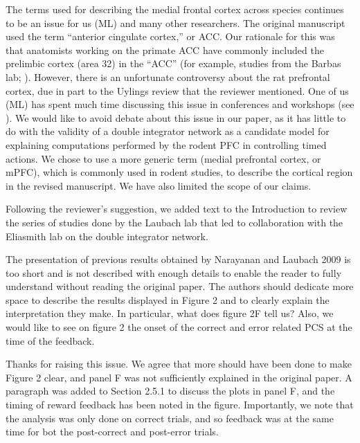 \documentclass[11pt,paper=letter]{scrartcl}
\begin{document}
The terms used for describing the medial frontal cortex
across species continues to be an issue for us (ML)
and many other researchers.
The original manuscript used
the term ``anterior cingulate cortex,'' or ACC.
Our rationale for this was that anatomists
working on the primate ACC
have commonly included the prelimbic cortex
(area 32) in the ``ACC''
(for example, studies from the Barbas lab;
).
However, there is an unfortunate controversy
about the rat prefrontal cortex,
due in part to the Uylings review
that the reviewer mentioned.
One of us (ML) has spent much time
discussing this issue
in conferences and workshops
(see ).
We would like to avoid debate about this issue
in our paper, as it has little to do
with the validity of a double integrator network
as a candidate model
for explaining computations
performed by the rodent PFC
in controlling timed actions.
We chose to use a more generic term
(medial prefrontal cortex, or mPFC),
which is commonly used in rodent studies,
to describe the cortical region in the revised manuscript.
We have also limited the scope of our claims.

Following the reviewer's suggestion,
we added text to the Introduction
to review the series of studies
done by the Laubach lab
that led to collaboration
with the Eliasmith lab
on the double integrator network.

\begin{quoting}
  The presentation of previous results obtained by Narayanan and
  Laubach 2009 is too short and is not described with enough details
  to enable the reader to fully understand without reading the
  original paper. The authors should dedicate more space to describe
  the results displayed in Figure 2 and to clearly explain the
  interpretation they make. In particular, what does figure 2F tell
  us? Also, we would like to see on figure 2 the onset of the correct
  and error related PCS at the time of the feedback.
\end{quoting}

Thanks for raising this issue.
We agree that more should have been done to make Figure 2 clear,
and panel F was not sufficiently explained
in the original paper.
A paragraph was added to Section 2.5.1
to discuss the plots in panel F,
and the timing of reward feedback
has been noted in the figure.
Importantly, we note that
the analysis was only done on correct trials,
and so feedback was at the same time
for bot the post-correct and post-error trials.
\end{document}
